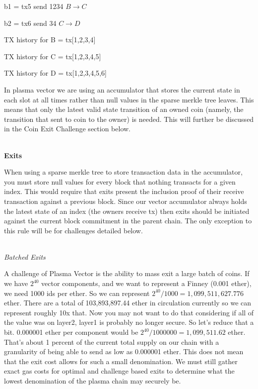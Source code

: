\documentclass[11pt]{article}
\begin{document}
b1 = tx5 send 1234 $B \rightarrow C$

b2 = tx6 send 34 $C \rightarrow D$

TX history for B = tx[1,2,3,4]

TX history for C = tx[1,2,3,4,5]

TX history for D = tx[1,2,3,4,5,6]


In plasma vector we are using an accumulator that stores the current state in each slot at all times rather than null values in the sparse merkle tree leaves. This means that only the latest valid state transition of an owned coin (namely, the transition that sent to coin to the owner) is needed. This will further be discussed in the Coin Exit Challenge section below.
\\
\\

\centerline{\textbf{Exits}}

When using a sparse merkle tree to store transaction data in the accumulator, you must store null values for every block that nothing transacts for a given index. This would require that exits present the inclusion proof of their receive transaction against a previous block. Since our vector accumulator always holds the latest state of an index (the owners receive tx) then exits should be initiated against the current block commitment in the parent chain. The only exception to this rule will be for challenges detailed below.
\\
\\

\centerline{\textit{Batched Exits}}

A challenge of Plasma Vector is the ability to mass exit a large batch of coins. If we have $2^{40}$ vector components, and we want to represent a Finney (0.001 ether), we need 1000 ids per ether. So we can represent $2^{40}/1000 = 1,099,511,627.776$ ether. There are a total of 103,893,897.44 ether in circulation currently so we can represent roughly  10x that. Now you may not want to do that considering if all of the value was on layer2, layer1 is probably no longer secure. So let's reduce that a bit. 0.000001 ether per component would be $2^{40}/1000000 = 1,099,511.62$ ether. That's about 1 percent of the current total supply on our chain with a granularity of being able to send as low as 0.000001 ether. This does not mean that the exit cost allows for such a small denomination. We must still gather exact gas costs for optimal and challenge based exits to determine what the lowest denomination of the plasma chain may securely be. 
\end{document}
